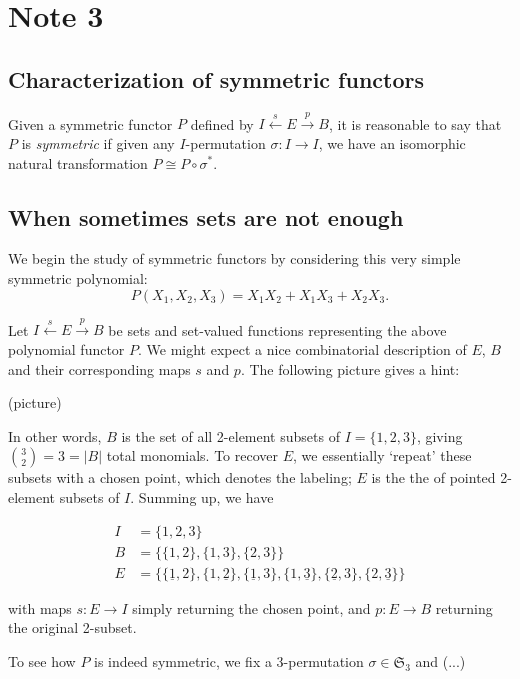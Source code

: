 
\pagebreak

\section{Note 3}

\subsection{Characterization of symmetric functors}

Given a symmetric functor $P$ defined by $I \overset{s}{\gets} E \overset{p}{\to} B$, it is reasonable to say that $P$ is \emph{symmetric} if given any $I$-permutation $\sigma:I\to I$, we have an isomorphic natural transformation $P \cong P\circ \sigma^*$.

\subsection{When sometimes sets are not enough}

We begin the study of symmetric functors by considering this very simple symmetric polynomial:
\[
P(X_1,X_2,X_3) = X_1X_2 + X_1X_3 + X_2X_3.
\]

Let $I \overset{s}{\gets} E \overset{p}{\to} B$ be sets and set-valued functions representing the above polynomial functor $P$. We might expect a nice combinatorial description of $E$, $B$ and their corresponding maps $s$ and $p$. The following picture gives a hint:

(picture)

In other words, $B$ is the set of all 2-element subsets of $I=\{1,2,3\}$, giving $\binom{3}{2}=3=|B|$ total monomials. To recover $E$, we essentially `repeat' these subsets with a chosen point, which denotes the labeling; $E$ is the the of pointed 2-element subsets of $I$. Summing up, we have

\begin{align*}
I &= \{1,2,3\}\\
B &= \{\{1,2\},\{1,3\},\{2,3\}\}\\
E &= \{\{\underline{1},2\}, \{1,\underline{2}\}, \{\underline{1},3\}, \{1,\underline{3}\},\{\underline{2},3\}, \{2,\underline{3}\}\}
\end{align*}

with maps $s:E\to I$ simply returning the chosen point, and $p:E\to B$ returning the original 2-subset.

To see how $P$ is indeed symmetric, we fix a 3-permutation $\sigma\in\mathfrak{S}_3$ and (...)

